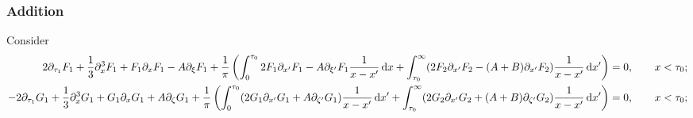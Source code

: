\documentclass[10pt,reqno,oneside,a4paper, landscape]{article}
\begin{document}
\subsubsection*{Addition}
Consider
\begin{align}
2 \partial_{\tau_1}F_1 + \frac{1}{3} \partial_x^3 F_1 + F_1\partial_x F_1 - A\partial_\xi F_1+ \frac{1}{\pi} \left(\int_0^{\tau_0} 2 F_1\partial_{x'} F_1  - A\partial_{\xi'} F_1\frac{1}{x -x'} \,\mathrm{d} x + \int^{\infty}_{\tau_0} (2 F_2\partial_{x'} F_2 - (A+B) \partial_{x'} F_2 )\frac{1}{x -x'} \,\mathrm{d} x' \right)  &= 0, \qquad x < \tau_0; \label{XT1}\\
- 2 \partial_{\tau_1} G_1 +  \frac{1}{3} \partial_x^3 G_1+ G_1\partial_{x} G_1 +A \partial_{\zeta} G_1  +  \frac{1}{\pi} \left( \int^{\tau_0}_{0} (2 G_1\partial_{x'} G_1 + A \partial_{\zeta'} G_1) \frac{1}{x-x'} \,\mathrm{d} x' + \int^{\infty}_{\tau_0} (2 G_2\partial_{x'} G_2+(A+B) \partial_{\zeta'} G_2 )\frac{1}{x -x'} \,\mathrm{d} x' \right) &= 0, \qquad x < \tau_0; \label{XT3}
\end{align}
\end{document}
